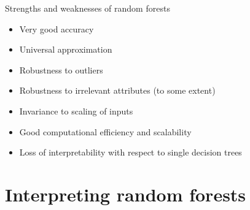 \documentclass{beamer}
\begin{document}
\begin{frame}{Strengths and weaknesses of random forests}

\begin{itemize}
\item Very good accuracy
\item Universal approximation
\item Robustness to outliers
\item Robustness to irrelevant attributes (to some extent)
\item Invariance to scaling of inputs
\item Good computational efficiency and scalability

\bigskip

\item<2> \alert{Loss of interpretability with respect to single decision trees}
\end{itemize}


\end{frame}



\section{Interpreting random forests}
\end{document}
